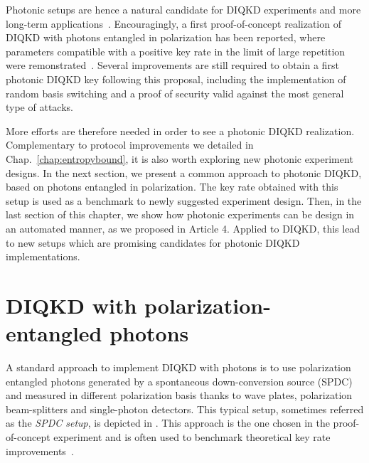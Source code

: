 \medbreak

Photonic setups are hence a natural candidate for DIQKD experiments and more long-term applications~\cite{Zapatero2023}.
Encouragingly, a first proof-of-concept realization of DIQKD with photons entangled in polarization has been reported, where parameters compatible with a positive key rate in the limit of large repetition were remonstrated~\cite{Liu2022}.
Several improvements are still required to obtain a first photonic DIQKD key following this proposal, including the implementation of random basis switching and a proof of security valid against the most general type of attacks.

\medbreak

More efforts are therefore needed in order to see a photonic DIQKD realization. 
Complementary to protocol improvements we detailed in Chap.~\ref{chap:entropybound}, it is also worth exploring new photonic experiment designs.
In the next section, we present a common approach to photonic DIQKD, based on photons entangled in polarization.
The key rate obtained with this setup is used as a benchmark to newly suggested experiment design.
Then, in the last section of this chapter, we show how photonic experiments can be design in an automated manner, as we proposed in Article 4.
Applied to DIQKD, this lead to new setups which are promising candidates for photonic DIQKD implementations.


\section{DIQKD with polarization-entangled photons}
\label{sec:PolarizationDIQKD}

A standard approach to implement DIQKD with photons is to use polarization entangled photons generated by a spontaneous down-conversion source (SPDC) and measured in different polarization basis thanks to wave plates, polarization beam-splitters and single-photon detectors.
This typical setup, sometimes referred as the \textit{SPDC setup}, is depicted in .
This approach is the one chosen in the proof-of-concept experiment \cite{Liu2022} and is often used to benchmark theoretical key rate improvements~\cite{Ho2020,Sekatski2021}.

